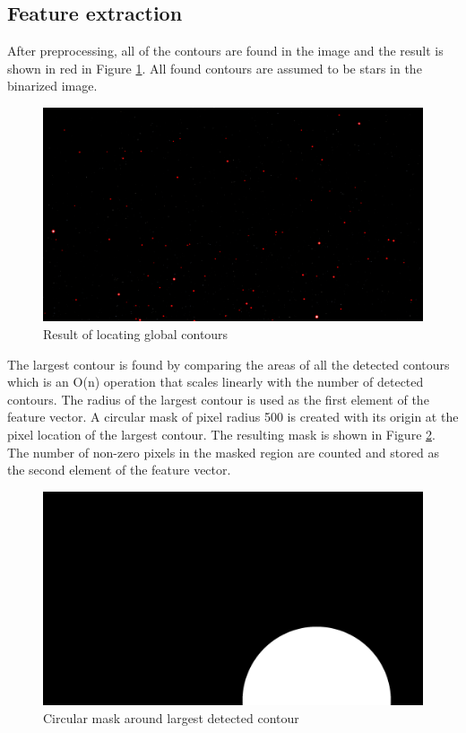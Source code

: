 \documentclass[10pt,twocolumn,letterpaper]{article}
\begin{document}
\subsection{Feature extraction}

After preprocessing, all of the contours are found in the image and the result is shown in red in Figure \ref{fig:star_contours}. All found contours are assumed to be stars in the binarized image.

\begin{figure}[H]
  \centering
   \includegraphics[width=0.9\linewidth]{all_contours}
   \caption{Result of locating global contours}
   \label{fig:star_contours}
\end{figure}

The largest contour is found by comparing the areas of all the detected contours which is an O(n) operation that scales linearly with the number of detected contours. The radius of the largest contour is used as the first element of the feature vector. A circular mask of pixel radius 500 is created with its origin at the pixel location of the largest contour. The resulting mask is shown in Figure \ref{fig:star_mask}. The number of non-zero pixels in the masked region are counted and stored as the second element of the feature vector.

\begin{figure}[H]
  \centering
   \includegraphics[width=0.9\linewidth]{mask}
   \caption{Circular mask around largest detected contour}
   \label{fig:star_mask}
\end{figure}
\end{document}
